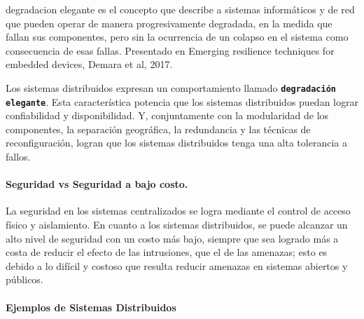  

\begin{tcolorbox}
	[colback=red!5!white,colframe=red!75!black,fonttitle=\bfseries,title=Degradación Elegante]
	\gls{degradacion elegante} es el concepto que describe  a sistemas informáticos y de red que pueden operar  de manera progresivamente degradada,  en la medida  que fallan sus componentes, pero sin la ocurrencia de un colapso en el sistema como consecuencia de esas  fallas. Presentado en Emerging resilience techniques for embedded devices, Demara et al, 2017.
\end{tcolorbox}

Los sistemas distribuidos expresan un comportamiento llamado  \texttt{\textbf{degradación elegante}}. Esta característica  potencia que los sistemas distribuidos puedan  lograr confiabilidad y disponibilidad. Y, conjuntamente con la modularidad de los componentes, la separación geográfica,  la redundancia y las técnicas de reconfiguración, logran que los sistemas distribuidos tenga una alta tolerancia a fallos.   

\paragraph{Seguridad vs Seguridad a bajo costo.}
La  seguridad en los sistemas centralizados  se logra mediante el control de acceso físico y aislamiento.
En cuanto a los sistemas distribuidos, se  puede alcanzar un alto nivel de seguridad con un costo más bajo,  siempre que sea logrado más a costa de reducir el efecto de las intrusiones, que el de las amenazas; esto es debido a lo difícil y costoso que resulta reducir amenazas en sistemas abiertos y públicos. 

\paragraph{Ejemplos de Sistemas Distribuidos} 

